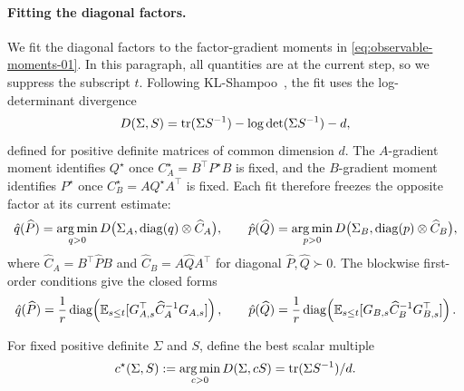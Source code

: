 \paragraph{Fitting the diagonal factors.}
We fit the diagonal factors to the factor-gradient moments in
\eqref{eq:observable-moments-01}. In this paragraph, all quantities are
at the current step, so we suppress the subscript $t$. Following
KL-Shampoo~\cite{klshampoo}, the fit uses the log-determinant
divergence~\cite{logdetdiv}
\[
  D(\Sigma,S)=\operatorname{tr}(\Sigma S^{-1})-\log\det(\Sigma S^{-1})-d,
\]
defined for positive definite matrices of common dimension $d$.
The $A$-gradient moment identifies $Q^\star$ once
$C^\star_A=B^\top P^\star B$ is fixed, and the $B$-gradient moment
identifies $P^\star$ once $C^\star_B=AQ^\star A^\top$ is fixed. Each fit
therefore freezes the opposite factor at its current estimate:
\begin{equation}\label{eq:factor-fit-01}
  \hat{q}(\widehat P)
  =
  \operatorname*{arg\,min}_{q>0}
  D\bigl(\Sigma_A,\operatorname{diag}(q)\otimes\widehat C_A\bigr),
  \qquad
  \hat{p}(\widehat Q)
  =
  \operatorname*{arg\,min}_{p>0}
  D\bigl(\Sigma_B,\operatorname{diag}(p)\otimes\widehat C_B\bigr),
\end{equation}
where
$\widehat C_A=B^\top\widehat P B$ and
$\widehat C_B=A\widehat Q A^\top$ for diagonal
$\widehat P,\widehat Q\succ0$. The blockwise first-order conditions give
the closed forms
\[
  \hat{q}(\widehat P)
  =
  \frac1r\operatorname{diag}\!\left(
    \mathbb{E}_{s\le t}[G_{A,s}^\top\widehat C_A^{-1}G_{A,s}]
  \right),
  \qquad
  \hat{p}(\widehat Q)
  =
  \frac1r\operatorname{diag}\!\left(
    \mathbb{E}_{s\le t}[G_{B,s}\widehat C_B^{-1}G_{B,s}^\top]
  \right).
\]

For fixed positive definite $\Sigma$ and $S$, define the best scalar
multiple
\[
  c^\star(\Sigma,S)
  :=
  \operatorname*{arg\,min}_{c>0}D(\Sigma,cS)
  =
  \operatorname{tr}(\Sigma S^{-1})/d .
\]

